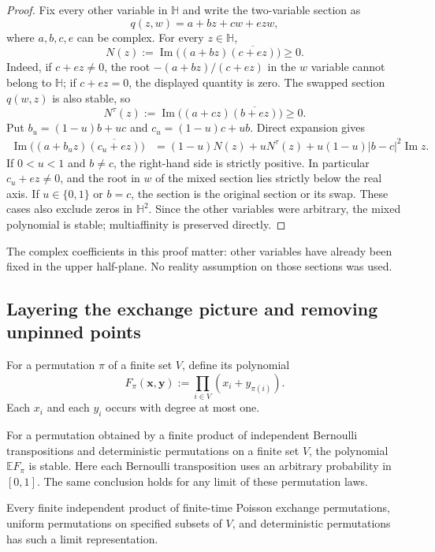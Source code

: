 \begin{proof}
Fix every other variable in $\mathbb H$ and write the two-variable
section as
\[
                 q(z,w)=a+bz+cw+ezw,
\]
where $a,b,c,e$ can be complex.  For every $z\in\mathbb H$,
\begin{equation}\label{eq:pin-imaginary-criterion}
 N(z):=\operatorname{Im}\bigl((a+bz)\overline{(c+ez)}\bigr)\ge0.
\end{equation}
Indeed, if $c+ez\ne0$, the root $-(a+bz)/(c+ez)$ in the $w$
variable cannot belong to $\mathbb H$; if $c+ez=0$, the displayed
quantity is zero.  The swapped section $q(w,z)$ is also stable, so
\[
 N^\tau(z):=\operatorname{Im}\bigl((a+cz)\overline{(b+ez)}\bigr)\ge0.
\]
Put $b_u=(1-u)b+uc$ and $c_u=(1-u)c+ub$.  Direct expansion gives
\begin{align}\label{eq:pin-symmetrization-identity}
 \operatorname{Im}\bigl((a+b_uz)\overline{(c_u+ez)}\bigr)
  &=(1-u)N(z)+uN^\tau(z)
       +u(1-u)|b-c|^2\operatorname{Im}z.
\end{align}
If $0<u<1$ and $b\ne c$, the right-hand side is strictly positive.
In particular $c_u+ez\ne0$, and the root in $w$ of the mixed section
lies strictly below the real axis.  If $u\in\{0,1\}$ or $b=c$,
the section is the original section or its swap.  These cases also
exclude zeros in $\mathbb H^2$.  Since the other variables were arbitrary,
the mixed polynomial is stable; multiaffinity is preserved directly.
\end{proof}

The complex coefficients in this proof matter: other variables have
already been fixed in the upper half-plane.  No reality assumption on
those sections was used.

\subsection{Layering the exchange picture and removing unpinned points}

For a permutation $\pi$ of a finite set $V$, define its polynomial
\[
             F_\pi(\boldsymbol x,\boldsymbol y)
                     :=\prod_{i\in V}(x_i+y_{\pi(i)}).
\]
Each $x_i$ and each $y_i$ occurs with degree at most one.

\begin{lemma}\label{lem:pin-exchange-symbol}
For a permutation obtained by a finite product of independent Bernoulli
transpositions and deterministic permutations on a finite set $V$,
the polynomial $\mathbb E F_\pi$ is stable.  Here each Bernoulli
transposition uses an arbitrary probability in $[0,1]$.  The same
conclusion holds for any limit of these permutation laws.

Every finite independent product of finite-time Poisson exchange
permutations, uniform permutations on specified subsets of $V$, and
deterministic permutations has such a limit representation.
\end{lemma}

